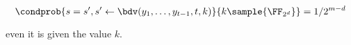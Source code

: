\documentclass[envcountsame,runningheads,notitlepage]{llncs}
\begin{document}
	\begin{equation*}
		\condprob{s = s', s' \leftarrow \bdv(y_1, \ldots, y_{t-1}, t, k)}{k \sample {\FF_{2^d}}} = 1/2^{m-d}
	\end{equation*}
	
	even it is given the value $k$.
	
	
	
	
	
\end{document}
